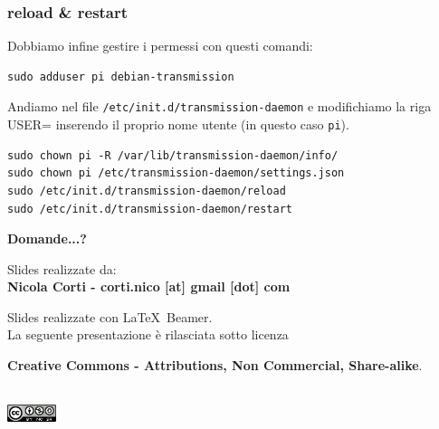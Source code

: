 \documentclass[xcolor=svgnames,11pt]{beamer}
\begin{document}
\begin{frame}[fragile]\frametitle{reload \& restart}
Dobbiamo infine gestire i permessi con questi comandi:
\begin{verbatim}
sudo adduser pi debian-transmission
\end{verbatim}
\medskip
Andiamo nel file \texttt{/etc/init.d/transmission-daemon} e modifichiamo la riga USER= inserendo il proprio nome utente (in questo caso \texttt{pi}).
\medskip
\begin{small}
\begin{verbatim}
sudo chown pi -R /var/lib/transmission-daemon/info/
sudo chown pi /etc/transmission-daemon/settings.json
sudo /etc/init.d/transmission-daemon/reload
sudo /etc/init.d/transmission-daemon/restart
\end{verbatim}
\end{small}
\end{frame}



\begin{frame}{}
\begin{center}
\begin{Huge}
{\color{green_raspi} \textbf{Domande...?}}
\end{Huge}

\vspace{1.5cm}
\begin{small}
Slides realizzate da:\\
\textbf{Nicola Corti - corti.nico [at] gmail [dot] com}\\

\bigskip

Slides realizzate con \LaTeX\ Beamer.\\
La seguente presentazione \`e rilasciata sotto licenza\\
\begin{footnotesize}	\textbf{Creative Commons - Attributions, Non Commercial, Share-alike}.
\end{footnotesize}
\\
\medskip
\includegraphics[height=0.5cm]{cc.png}

\end{small}
\end{center}
\end{frame}
\end{document}
